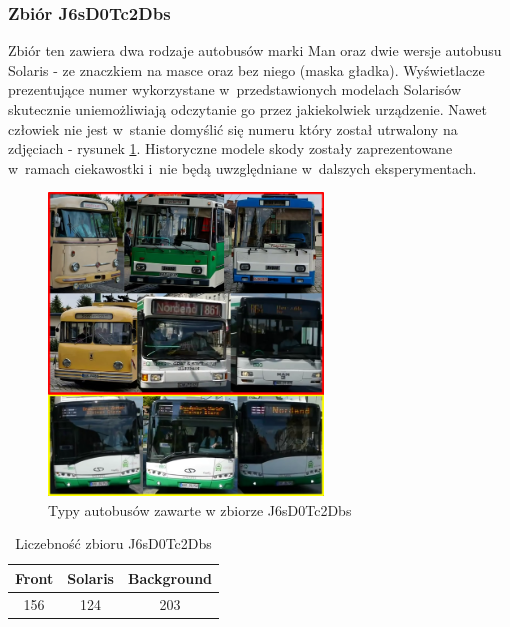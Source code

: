 \newpage

\subsubsection{Zbiór J6sD0Tc2Dbs}

Zbiór ten zawiera dwa rodzaje autobusów marki Man oraz dwie wersje autobusu
Solaris - ze znaczkiem na masce oraz bez niego (maska gładka). Wyświetlacze
prezentujące numer wykorzystane w~przedstawionych modelach Solarisów
skutecznie uniemożliwiają odczytanie go przez jakiekolwiek urządzenie. 
Nawet człowiek nie jest w~stanie domyślić się numeru który został utrwalony
na zdjęciach - rysunek \ref{fig:J6sD0Tc2Dbs_types}. Historyczne modele
skody zostały zaprezentowane w~ramach ciekawostki i~nie będą uwzględniane
w~dalszych eksperymentach.

\begin{figure}[!h]
    \centering
    \includegraphics[width=0.65\textwidth]{img/exp_trainig_data_J6s}
    \caption{Typy autobusów zawarte w zbiorze J6sD0Tc2Dbs}
    \label{fig:J6sD0Tc2Dbs_types}
\end{figure}

\begin{table}[!h]
    \centering
    \begin{tabular}{c|c|c}
        Front   & Solaris   & Background \\ \hline
        156     & 124       & 203 
    \end{tabular}
    \caption{Liczebność zbioru J6sD0Tc2Dbs}
    \label{tab:J6sD0Tc2Dbs_count}
\end{table}

\newpage

